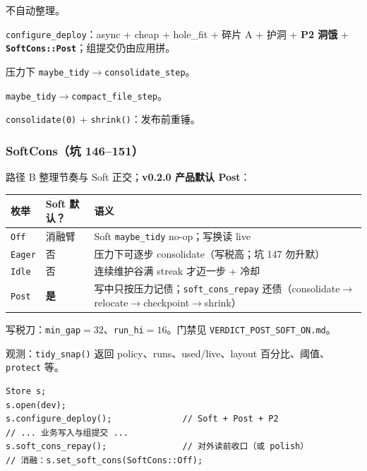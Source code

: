 \begin{description}[style=nextline,leftmargin=1.6em]
  \item[\texttt{TidyPolicy::Off}] 不自动整理。
  \item[\texttt{Soft}] \texttt{configure\_deploy}：async + cheap + hole\_fit + 碎片 A + 护洞 + \textbf{P2 洞饿} + \textbf{\texttt{SoftCons::Post}}；组提交仍由应用拼。
  \item[\texttt{Hard}] 压力下 \texttt{maybe\_tidy}$\to$\texttt{consolidate\_step}。
  \item[\texttt{Periodic}] \texttt{maybe\_tidy}$\to$\texttt{compact\_file\_step}。
  \item[\texttt{polish()}] \texttt{consolidate(0)} + \texttt{shrink()}：发布前重锤。
\end{description}

\subsubsection{SoftCons（坑 146--151）}
路径 B 整理节奏与 Soft 正交；\textbf{v0.2.0 产品默认 Post}：
\begin{center}
\small
\begin{tabular}{@{}llp{7.2cm}@{}}
\toprule
枚举 & Soft 默认？ & 语义 \\
\midrule
\texttt{Off} & 消融臂 & Soft \texttt{maybe\_tidy} no-op；写换读 live \\
\texttt{Eager} & 否 & 压力下可逐步 consolidate（写税高；坑 147 勿升默） \\
\texttt{Idle} & 否 & 连续维护谷满 streak 才迈一步 + 冷却 \\
\texttt{Post} & \textbf{是} & 写中只按压力记债；\texttt{soft\_cons\_repay} 还债（consolidate$\to$relocate$\to$checkpoint$\to$shrink） \\
\bottomrule
\end{tabular}
\end{center}

写税刀：\texttt{min\_gap}$=32$、\texttt{run\_hi}$=16$。门禁见 \texttt{VERDICT\_POST\_SOFT\_ON.md}。

观测：\texttt{tidy\_snap()} 返回 policy、runs、used/live、layout 百分比、阈值、\texttt{protect} 等。

\begin{lstlisting}[language=fcsapi,caption={部署侧最小用法示意（v0.2.0）}]
Store s;
s.open(dev);
s.configure_deploy();              // Soft + Post + P2
// ... 业务写入与组提交 ...
s.soft_cons_repay();               // 对外读前收口（或 polish）
// 消融：s.set_soft_cons(SoftCons::Off);
\end{lstlisting}
